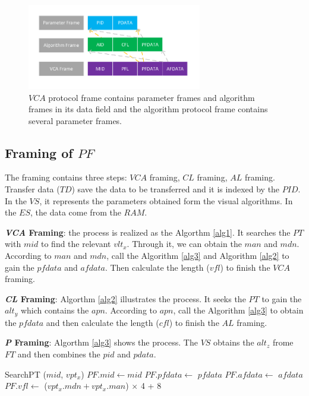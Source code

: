 \documentclass[journal,UTF8]{IEEEtran}
\begin{document}
\begin{figure}
	\centering
	\includegraphics[width=3in]{fig/Protocol.pdf}
	\caption{ $VCA$ protocol frame contains parameter frames and algorithm frames in its data field and the algorithm protocol frame contains several parameter frames.}
	\label{fig:Protocol}
\end{figure}
\subsection{Framing of $PF$}
The framing contains three steps: $VCA$ framing, $CL$ framing, $AL$ framing. Transfer data ($TD$) save the data to be transferred and it is indexed by the $PID$. In the $VS$, it represents the parameters obtained form the visual algorithms. In the $ES$, the data come from the $RAM$.   


\textbf{\emph{VCA} Framing}: the process is realized as the Algorthm \ref{alg1}. It searches the $PT$ with $mid$ to find the relevant $vlt_x$. Through it, we can obtain the $man$ and $mdn$. According to $man$ and $mdn$, call the Algorithm \ref{alg3} and Algorithm \ref{alg2} to gain the $pfdata$ and $afdata$. Then calculate the length ($vfl$) to finish the $VCA$ framing.

\textbf{\emph{CL} Framing}: Algorthm \ref{alg2} illustrates the process. It seeks the $PT$ to gain the $alt_y$ which contains the $apn$. According to $apn$, call the Algorithm \ref{alg3} to obtain the $pfdata$ and then calculate the length ($cfl$) to finish the $AL$ framing.  

\textbf{\emph{P} Framing}: Algorthm \ref{alg3} shows the process. The $VS$ obtains the $alt_z$ frome $FT$ and then combines the $pid$ and $pdata$.


\begin{algorithm}
	\label{alg1}
	\caption{$VCAFraming$}%
	SearchPT ($mid$, $vpt_x$)\;
	$PF.mid\leftarrow mid$\; 
    $PF.pfdata\leftarrow$ $pfdata$\; 
    $PF.afdata\leftarrow$ $afdata$\; 
	$PF.vfl\leftarrow$ ($vpt_x.mdn+vpt_x.man$) $\times$ 4 + 8\;
\end{algorithm}
\end{document}
